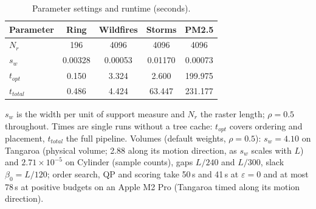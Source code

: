 \begin{table}[!tb]
\centering
\caption{Parameter settings and runtime (seconds).}
\label{tab:anchor-parameters-final}
\footnotesize
\setlength{\tabcolsep}{2pt}
\renewcommand{\arraystretch}{0.95}
\begin{tabular}{@{}lcccc@{}}
\toprule
Parameter & Ring & Wildfires & Storms & PM2.5 \\
\midrule
$N_r$ & 196 & 4096 & 4096 & 4096 \\
$s_w$ & 0.00328 & 0.00053 & 0.01170 & 0.00073 \\
$t_{opt}$ & 0.150 & 3.324 & 2.600 & 199.975 \\
$t_{total}$ & 0.486 & 4.424 & 63.447 & 231.177 \\
\bottomrule
\end{tabular}
\vspace{2pt}
\begin{minipage}{0.94\columnwidth}\footnotesize $s_w$ is the width per unit of support measure and $N_r$ the raster length; $\rho=0.5$ throughout. Times are single runs without a tree cache: $t_{opt}$ covers ordering and placement, $t_{total}$ the full pipeline. Volumes (default weights, $\rho=0.5$): $s_w=4.10$ on Tangaroa (physical volume; 2.88 along its motion direction, as $s_w$ scales with $L$) and $2.71\times10^{-5}$ on Cylinder (sample counts), gaps $L/240$ and $L/300$, slack $\beta_0=L/120$; order search, QP and scoring take 50\,s and 41\,s at $\varepsilon=0$ and at most 78\,s at positive budgets on an Apple M2 Pro (Tangaroa timed along its motion direction).\end{minipage}
\end{table}
